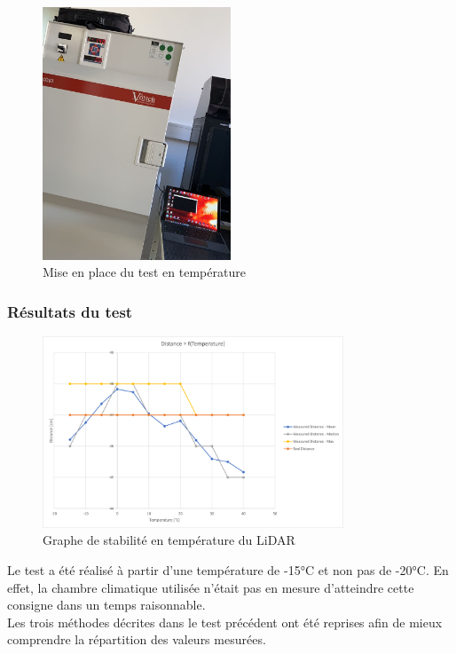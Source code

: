 \begin{figure}[H]
    \centering
    \includegraphics[width=0.5\textwidth]{Images/LiDAR/TempMes.jpeg}
    \caption{Mise en place du test en température}
    \label{fig:TempError}
\end{figure}

\subsubsection{Résultats du test}

\begin{figure}[H]
    \centering
    \includegraphics[width=0.8\textwidth]{Images/LiDAR/LiDAR_TempStabilityGraph.png}
    \caption{Graphe de stabilité en température du LiDAR}
    \label{fig:TempErrorGraph}
\end{figure}

Le test a été réalisé à partir d'une température de -15°C et non pas de -20°C. En effet, la chambre
climatique utilisée n'était pas en mesure d'atteindre cette consigne dans un temps raisonnable.\\
Les trois méthodes décrites dans le test précédent ont été reprises afin de mieux comprendre la
répartition des valeurs mesurées.


